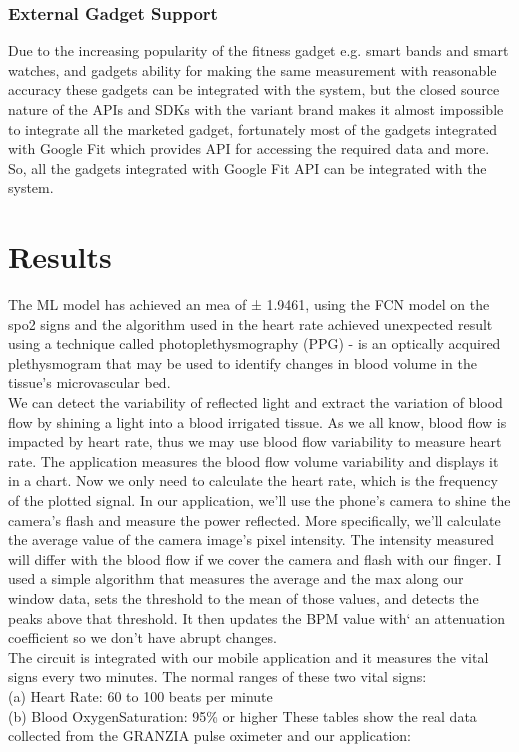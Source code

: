 \documentclass{bmcart}
\begin{document}
\subsubsection*{External Gadget Support}
Due to the increasing popularity of the fitness gadget e.g. smart bands and
smart watches, and gadgets ability for making the same measurement with
reasonable accuracy these gadgets can be integrated with the system, but the
closed source nature of the APIs and SDKs with the variant  brand makes it
almost impossible to integrate all the marketed gadget, fortunately most of the
gadgets integrated with Google Fit which provides API for accessing the required
data and more. So, all the gadgets integrated with Google Fit API can be
integrated with the system.

\section*{Results}
The ML model has achieved an mea of ± 1.9461, using the FCN model on the spo2
signs and the algorithm used in the heart rate achieved unexpected result using
a technique called photoplethysmography (PPG) - is an optically acquired
plethysmogram that may be used to identify changes in blood volume in the
tissue's microvascular bed.\\
We can detect the variability of reflected light and extract the variation of
blood flow by shining a light into a blood irrigated tissue. As we all know,
blood flow is impacted by heart rate, thus we may use blood flow variability to
measure heart rate. The application measures the blood flow volume variability
and displays it in a chart. Now we only need to calculate the heart rate, which
is the frequency of the plotted signal. In our application, we'll use the
phone's camera to shine the camera's flash and measure the power reflected. More
specifically, we'll calculate the average value of the camera image's pixel
intensity. The intensity measured will differ with the blood flow if we cover
the camera and flash with our finger. I used a simple algorithm that measures
the average and the max along our window data, sets the threshold to the mean of
those values, and detects the peaks above that threshold. It then updates the
BPM value with` an attenuation coefficient so we don’t have abrupt changes.\\
The circuit is integrated with our mobile application and it measures the vital
signs every two minutes. The normal ranges of these two vital signs: \\(a) Heart
Rate: 60 to 100 beats per minute \cite{signs} \\(b) Blood OxygenSaturation: 95\% or
higher \cite{olvl} These tables show the real data collected from the GRANZIA pulse
oximeter and our application:
\end{document}
